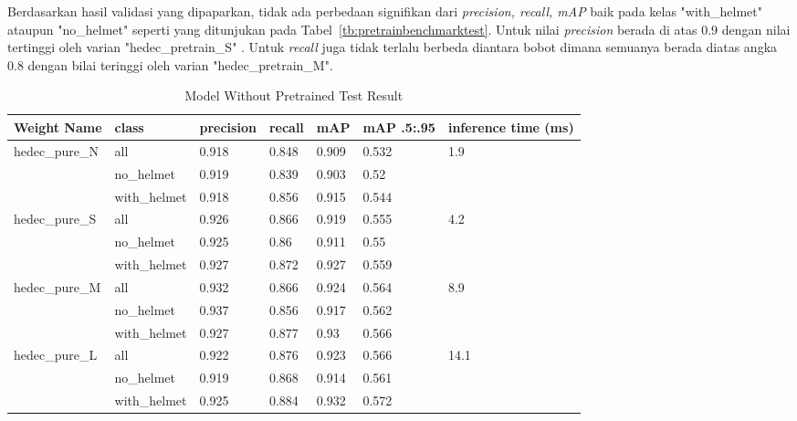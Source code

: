 \par Berdasarkan hasil validasi yang dipaparkan, tidak ada perbedaan signifikan dari \emph{precision, recall, mAP} 
baik pada kelas "with\_helmet" ataupun "no\_helmet" seperti yang ditunjukan pada Tabel~\ref{tb:pretrainbenchmarktest}.
Untuk nilai \emph{precision} berada di atas 0.9 dengan nilai tertinggi oleh varian "hedec\_pretrain\_S" . Untuk \emph{recall}
juga tidak terlalu berbeda diantara bobot dimana semuanya berada diatas angka 0.8 dengan bilai teringgi 
oleh varian "hedec\_pretrain\_M". 


\begin{table}
  \centering
  \caption{Model Without Pretrained Test Result}
  \label{tb:purebenchmarktest}
  \begin{tabular}{|l|l|l|l|l|l|l||} 
    \hline
    Weight Name                          & class        & precision & recall & mAP   & mAP .5:.95 & inference time (ms)    \\ 
    \hline
    \multirow{3}{*}{hedec\_pure\_N}     & all          & 0.918     & 0.848  & 0.909 & 0.532      & \multirow{3}{*}{1.9}   \\
                                        & no\_helmet   & 0.919     & 0.839  & 0.903 & 0.52       &                        \\
                                        & with\_helmet & 0.918     & 0.856  & 0.915 & 0.544      &                        \\ 
    \hline
    \multirow{3}{*}{hedec\_pure\_S}     & all          & 0.926     & 0.866  & 0.919 & 0.555      & \multirow{3}{*}{4.2}   \\
                                        & no\_helmet   & 0.925     & 0.86   & 0.911 & 0.55       &                        \\
                                        & with\_helmet & 0.927     & 0.872  & 0.927 & 0.559      &                        \\ 
    \hline
    \multirow{3}{*}{hedec\_pure\_M}     & all          & 0.932     & 0.866  & 0.924 & 0.564      & \multirow{3}{*}{8.9}   \\
                                        & no\_helmet   & 0.937     & 0.856  & 0.917 & 0.562      &                        \\
                                        & with\_helmet & 0.927     & 0.877  & 0.93  & 0.566      &                        \\ 
    \hline
    \multirow{3}{*}{hedec\_pure\_L}     & all          & 0.922     & 0.876  & 0.923 & 0.566      & \multirow{3}{*}{14.1}  \\
                                        & no\_helmet   & 0.919     & 0.868  & 0.914 & 0.561      &                        \\
                                        & with\_helmet & 0.925     & 0.884  & 0.932 & 0.572      &                        \\
    \hline
  \end{tabular}
\end{table}

